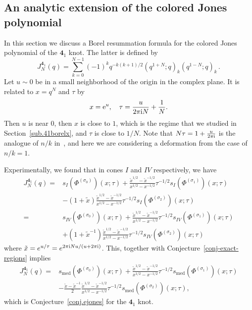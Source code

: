 \documentclass[12pt,reqno]{amsart}
\theoremstyle{definition}
\def\s{\sigma}
\def\tx{\tilde{x}}
\def\={\;=\;}
\def\ri{\mathrm{i}}
\def\tx{\tilde{x}}
\def\re{{\rm e}}
\def\ri{{\rm i}}
\def\md{\mathbf}
\newcommand{\knot}[1]{\md{#1}}
\newcommand{\nn}{\nonumber \\}
\begin{document}
\subsection{An analytic extension of the colored Jones polynomial} 
\label{sub.CJ41analytic}

In this section we discuss a Borel resummation formula for the colored Jones
polynomial of the $\knot{4}_1$ knot. The latter is defined by
\begin{equation}
  J^{\knot{4}_1}_N(q) = \sum_{k=0}^{N-1}(-1)^k
  q^{-k(k+1)/2}(q^{1+N};q)_k(q^{1-N};q)_k \,.%
\end{equation}
Let $u \sim 0$ be in a small neighborhood of the origin in the complex plane.
It is related to $x = q^N$ and $\tau$ by
\begin{equation}
  x = \re^{u},\quad \tau = \frac{u}{2\pi\ri N}+\frac{1}{N}.
  \label{eq:x-n-tau}
\end{equation}
Then $u$ is near $0$, then $x$ is close to $1$, which is the regime
that we studied in Section~\ref{sub.41borelx}, and $\tau$ is close to
$1/N$.  Note that $N\tau = 1+\frac{u}{2\pi\ri}$ is the analogue of
$n/k$ in~\cite{gukov}, and here we are considering a deformation from
the case of $n/k=1$.

Experimentally, we found that in cones $I$ and $IV$ respectively, we
have 
\begin{subequations}
  \begin{align}
    J^{\knot{4}_1}_N(q) =
    &s_{I}(\Phi^{(\s_0)})(x;\tau)
      +\frac{\tx^{1/2}-\tx^{-1/2}}{x^{1/2}-x^{-1/2}}
      \tau^{-1/2}s_{I}(\Phi^{(\s_1)})(x;\tau)
      \nn
    &-(1+\tx)\frac{\tx^{1/2}-\tx^{-1/2}}{x^{1/2}-x^{-1/2}}\tau^{-1/2}
      s_{I}(\Phi^{(\s_2)})(x;\tau)
      \label{eq:Jn-s1}
    \\=
    &s_{IV}(\Phi^{(\s_0)})(x;\tau)
      +\frac{\tx^{1/2}-\tx^{-1/2}}{x^{1/2}-x^{-1/2}}
      \tau^{-1/2}s_{IV}(\Phi^{(\s_1)})(x;\tau)\nn
    &+(1+\tx^{-1})\frac{\tx^{1/2}-\tx^{-1/2}}{x^{1/2}-x^{-1/2}}\tau^{-1/2}
      s_{IV}(\Phi^{(\s_2)})(x;\tau)
      \label{eq:Jn-s2}
  \end{align}
\end{subequations}
where $\tx=e^{u/\tau}=e^{2\pi\ri N u/(u+2\pi\ri)}$. This, together
with Conjecture~\ref{conj-exact-regions} implies 
\begin{align}
  J^{\knot{4}_1}_N(q) =
  &s_{\text{med}}(\Phi^{(\s_0)})(x;\tau)
    +\frac{\tx^{1/2}-\tx^{-1/2}}{x^{1/2}-x^{-1/2}}
    \tau^{-1/2}s_{\text{med}}(\Phi^{(\s_1)})(x;\tau)\nn
  &-\frac{\tx-\tx^{-1}}{2}\frac{\tx^{1/2}-\tx^{-1/2}}{x^{1/2}-x^{-1/2}}
    \tau^{-1/2}s_{\text{med}}(\Phi^{(\s_2)})(x;\tau) ,
  \label{eq:Jn-smed}
\end{align}
which is Conjecture~\ref{conj.ejones} for the $\knot{4}_1$ knot. 
\end{document}
